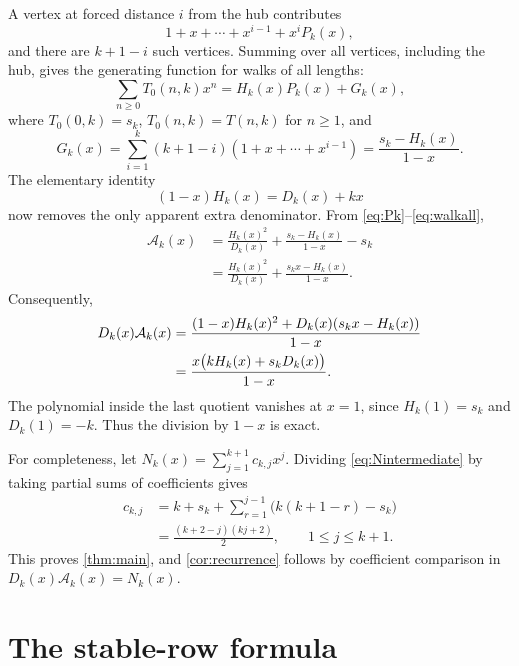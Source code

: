 \documentclass[11pt]{article}
\theoremstyle{remark}
\newcommand{\GF}{\mathcal A}
\begin{document}
A vertex at forced distance $i$ from the hub contributes
\[
 1+x+\cdots+x^{i-1}+x^iP_k(x),
\]
and there are $k+1-i$ such vertices.  Summing over all vertices, including the
hub, gives the generating function for walks of all lengths:
\begin{equation}\label{eq:walkall}
 \sum_{n\geq0}T_0(n,k)x^n
 =H_k(x)P_k(x)+G_k(x),
\end{equation}
where $T_0(0,k)=s_k$, $T_0(n,k)=T(n,k)$ for $n\geq1$, and
\[
 G_k(x)=\sum_{i=1}^{k}(k+1-i)(1+x+\cdots+x^{i-1})
       =\frac{s_k-H_k(x)}{1-x}.
\]
The elementary identity
\begin{equation}\label{eq:keyidentity}
 (1-x)H_k(x)=D_k(x)+kx
\end{equation}
now removes the only apparent extra denominator.  From
\eqref{eq:Pk}--\eqref{eq:walkall},
\begin{align*}
 \GF_k(x)
 &=\frac{H_k(x)^2}{D_k(x)}+\frac{s_k-H_k(x)}{1-x}-s_k\\
 &=\frac{H_k(x)^2}{D_k(x)}+\frac{s_kx-H_k(x)}{1-x}.
\end{align*}
Consequently,
\begin{align}
 D_k(x)\GF_k(x)
 &=\frac{(1-x)H_k(x)^2+D_k(x)(s_kx-H_k(x))}{1-x}\notag\\
 &=\frac{x\bigl(kH_k(x)+s_kD_k(x)\bigr)}{1-x}.
 \label{eq:Nintermediate}
\end{align}
The polynomial inside the last quotient vanishes at $x=1$, since
$H_k(1)=s_k$ and $D_k(1)=-k$.  Thus the division by $1-x$ is exact.

For completeness, let $N_k(x)=\sum_{j=1}^{k+1}c_{k,j}x^j$.  Dividing
\eqref{eq:Nintermediate} by taking partial sums of coefficients gives
\begin{align*}
 c_{k,j}
 &=k+s_k+\sum_{r=1}^{j-1}\bigl(k(k+1-r)-s_k\bigr)\\
 &=\frac{(k+2-j)(kj+2)}2,
 \qquad 1\leq j\leq k+1.
\end{align*}
This proves \cref{thm:main}, and \cref{cor:recurrence} follows by coefficient
comparison in $D_k(x)\GF_k(x)=N_k(x)$.

\begin{table}[ht]
\centering
\small
\caption{The first numerator polynomials, generated directly from
$c_{k,j}=((k+2-j)(kj+2))/2$.}
\label{tab:numerators}
\resizebox{\textwidth}{!}{}
\end{table}

\section{The stable-row formula}
\end{document}
